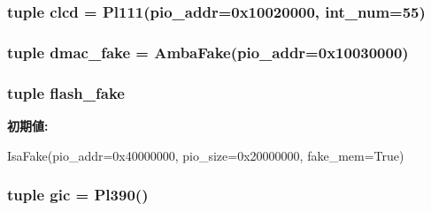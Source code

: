 \hypertarget{classRealView_1_1RealViewPBX_aca2e883cdc9c636e4500344d5892f6c9}{
\subsubsection[{clcd}]{\setlength{\rightskip}{0pt plus 5cm}tuple {\bf clcd} = {\bf Pl111}(pio\_\-addr=0x10020000, int\_\-num=55)}}
\label{classRealView_1_1RealViewPBX_aca2e883cdc9c636e4500344d5892f6c9}
\hypertarget{classRealView_1_1RealViewPBX_acbc3f8e786184963ae1388d9d9a981be}{
\subsubsection[{dmac\_\-fake}]{\setlength{\rightskip}{0pt plus 5cm}tuple {\bf dmac\_\-fake} = {\bf AmbaFake}(pio\_\-addr=0x10030000)}}
\label{classRealView_1_1RealViewPBX_acbc3f8e786184963ae1388d9d9a981be}
\hypertarget{classRealView_1_1RealViewPBX_a6dbb35031fbd3dbded6e05ca5db58c8e}{
\subsubsection[{flash\_\-fake}]{\setlength{\rightskip}{0pt plus 5cm}tuple {\bf flash\_\-fake}}}
\label{classRealView_1_1RealViewPBX_a6dbb35031fbd3dbded6e05ca5db58c8e}
{\bfseries 初期値:}
\begin{DoxyCode}
IsaFake(pio_addr=0x40000000, pio_size=0x20000000,
                            fake_mem=True)
\end{DoxyCode}
\hypertarget{classRealView_1_1RealViewPBX_a40243beb62d217c3a9e35801ae739fd0}{
\subsubsection[{gic}]{\setlength{\rightskip}{0pt plus 5cm}tuple {\bf gic} = {\bf Pl390}()}}
